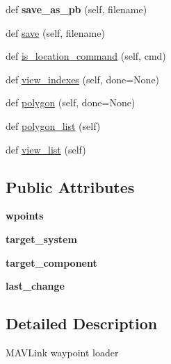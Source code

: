 \begin{DoxyCompactItemize}
def {\bfseries save\+\_\+as\+\_\+pb} (self, filename)
\item 
def \hyperlink{classpymavlink_1_1mavwp_1_1MAVWPLoader_af1b338ee6356f5cbbae19fef1d37057d}{save} (self, filename)
\item 
def \hyperlink{classpymavlink_1_1mavwp_1_1MAVWPLoader_a658e38dfc8136515b4a20c602f2cdd48}{is\+\_\+location\+\_\+command} (self, cmd)
\item 
def \hyperlink{classpymavlink_1_1mavwp_1_1MAVWPLoader_a7ca25ea7f5367931e2be4b2d6fad3385}{view\+\_\+indexes} (self, done=None)
\item 
def \hyperlink{classpymavlink_1_1mavwp_1_1MAVWPLoader_a200db285358c83ec7f112a1268b6c858}{polygon} (self, done=None)
\item 
def \hyperlink{classpymavlink_1_1mavwp_1_1MAVWPLoader_aec3fe4c657e6ee74b219e53f3c43f472}{polygon\+\_\+list} (self)
\item 
def \hyperlink{classpymavlink_1_1mavwp_1_1MAVWPLoader_ad3554fb946d1618c0fa8d163a10473f0}{view\+\_\+list} (self)
\end{DoxyCompactItemize}
\subsection*{Public Attributes}
\begin{DoxyCompactItemize}
\item 
\mbox{\label{classpymavlink_1_1mavwp_1_1MAVWPLoader_af32614c372c60f9a3cb2669e8bdea740}} 
{\bfseries wpoints}
\item 
\mbox{\label{classpymavlink_1_1mavwp_1_1MAVWPLoader_ab2508eaf2dbcb542806555784f33d373}} 
{\bfseries target\+\_\+system}
\item 
\mbox{\label{classpymavlink_1_1mavwp_1_1MAVWPLoader_a246f85ae9561c8f657f97849d59b2773}} 
{\bfseries target\+\_\+component}
\item 
\mbox{\label{classpymavlink_1_1mavwp_1_1MAVWPLoader_a197051cf338f456a053c8819dd15b474}} 
{\bfseries last\+\_\+change}
\end{DoxyCompactItemize}


\subsection{Detailed Description}
\begin{DoxyVerb}MAVLink waypoint loader\end{DoxyVerb}
 


